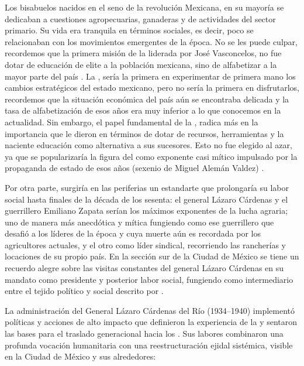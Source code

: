 Los bisabuelos nacidos en el seno de la revolución Mexicana, en su mayoría se dedicaban a cuestiones agropecuarias,
ganaderas y de actividades del sector primario. Su vida era tranquila en términos sociales, es decir, poco se
relacionaban con los movimientos emergentes de la época. No se les puede culpar, recordemos que la primera misión
de la  liderada por José Vasconcelos, no fue dotar de educación de elite
a la población mexicana, sino de alfabetizar a la mayor parte del país \cite{freire1993pedagogia}. La
, sería la primera en experimentar de primera mano los cambios
estratégicos del estado mexicano, pero no sería la primera en disfrutarlos, recordemos que la situación económica
del país aún se encontraba delicada y la tasa de alfabetización de esos años era muy inferior a lo que conocemos en
la actualidad. Sin embargo, el papel fundamental de la , radica más en la
importancia que le dieron en términos de dotar de recursos, herramientas y la naciente educación como alternativa
a sus sucesores. Esto no fue elegido al azar, ya que se popularizaría la figura del  como
exponente casi mítico impulsado por la propaganda de estado de esos años (sexenio de Miguel Alemán Valdez)
\cite{agustin_tragicomedia1}.

Por otra parte, surgiría en las periferias un estandarte que prolongaría su labor social hasta finales de la
década de los sesenta: el general Lázaro Cárdenas y el guerrillero Emiliano Zapata serían los máximos exponentes
de la lucha agraria; uno de manera más anecdótica y mítica fungiendo como ese guerrillero que desafió a los
líderes de la época y cuya muerte aún es recordada por los agricultores actuales, y el otro como líder sindical,
recorriendo las rancherías y locaciones de su propio país. En la sección sur de la Ciudad de México se tiene un
recuerdo alegre sobre las visitas constantes del general Lázaro Cárdenas en su mandato como presidente y posterior
labor social, fungiendo como  intermediario entre el tejido político y social descrito por
\cite{topalov_cuestion}.

La administración del General Lázaro Cárdenas del Río (1934--1940) implementó políticas y acciones de alto impacto
que definieron la experiencia de la  y sentaron las bases para el traslado generacional
hacia los . Sus labores combinaron una profunda vocación humanitaria con una reestructuración
ejidal sistémica, visible en la Ciudad de México y sus alrededores:

